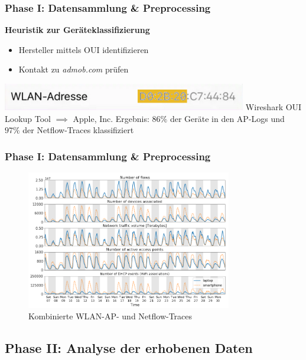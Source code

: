 \documentclass{beamer}
\begin{document}
\begin{frame}
  \frametitle{Phase I: Datensammlung \& Preprocessing}
  \textbf{Heuristik zur Geräteklassifizierung}
  \begin{itemize}
    \item Hersteller mittels OUI identifizieren
    \item Kontakt zu \textit{admob.com} prüfen
  \end{itemize}
  \includegraphics[width=0.8\textwidth]{images/MAC_iPhone.png}\newline
  Wireshark OUI Lookup Tool $\implies$ Apple, Inc.\newline\newline
  Ergebnis: $86\%$ der Geräte in den AP-Logs und $97\%$ der Netflow-Traces klassifiziert
\end{frame}

\begin{frame}
  \frametitle{Phase I: Datensammlung \& Preprocessing}
  \begin{figure}
    \centering
    \includegraphics[width=0.8\textwidth]{images/traces.png}
    \caption*{Kombinierte WLAN-AP- und Netflow-Traces}
  \end{figure}  
\end{frame}

\subsection{\textbf{Phase II}: Analyse der erhobenen Daten}
\end{document}
